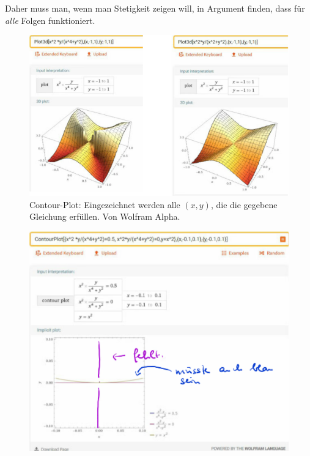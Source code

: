 \begin{beispiele}
\begin{eigenschaftenenumerate}
\begin{beispiele*}
            Daher muss man, wenn man Stetigkeit zeigen will, in Argument finden, dass für \emph{alle} Folgen funktioniert.
            \begin{figure}[H]
                \centering
                \includegraphics[width=\linewidth]{figures/contourplot_r_n_stetigkeit_beispiele}
                \caption*{Contour-Plot: Eingezeichnet werden alle \( (x,y) \), die die gegebene Gleichung erfüllen.
                Von Wolfram Alpha.}
                \label{fig:countourplot_r_n_stetigkeit_beispiele}
            \end{figure}
            \begin{figure}[H]
                \centering
                \includegraphics[width=\linewidth]{figures/contourplot_r_n_stetigkeit_beispiele_2_d}
                \label{fig:countourplot_r_n_stetigkeit_beispiele_2_d}
            \end{figure}
        \end{beispiele*}
    \end{eigenschaftenenumerate}
\end{beispiele}
